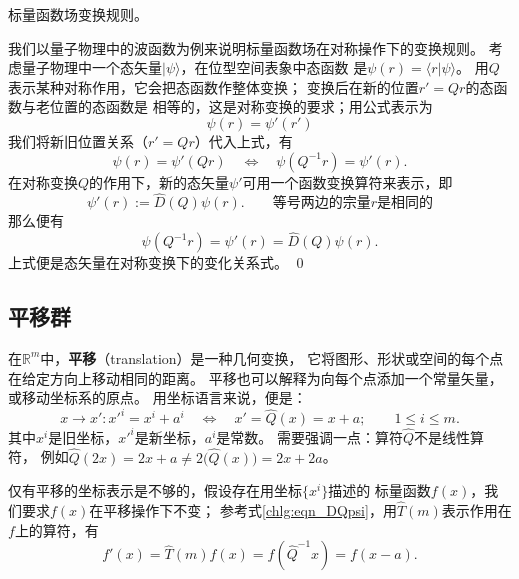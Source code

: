\begin{example}
    标量函数场变换规则。
\end{example}
我们以量子物理中的波函数为例来说明标量函数场在对称操作下的变换规则。
考虑量子物理中一个态矢量$|\psi\rangle$，在位型空间表象中态函数
是$\psi(r) = \langle r|\psi\rangle$。
用$Q$表示某种对称作用，它会把态函数作整体变换；
变换后在新的位置$r'=Q r$的态函数与老位置的态函数是
相等的，这是对称变换的要求；用公式表示为
\begin{equation}
    \psi(r) = \psi'(r')
\end{equation}
我们将新旧位置关系（$r'=Q r$）代入上式，有
\begin{equation}
    \psi(r) = \psi'(Q r) \quad \Leftrightarrow \quad
    \psi(Q^{-1}r) = \psi'(r) .
\end{equation}
在对称变换$Q$的作用下，新的态矢量$\psi'$可用一个函数变换算符来表示，即
\begin{equation}
    \psi'(r) :=\hat{D}(Q)\psi(r).
    \qquad \text{等号两边的宗量$r$是相同的}
\end{equation}
那么便有
\begin{equation}\label{chlg:eqn_DQpsi}
    \psi(Q^{-1}r)  = \psi'(r) = \hat{D}(Q)\psi(r) .
\end{equation}
上式便是态矢量在对称变换下的变化关系式。    \qed

\subsection{平移群}\label{chlg:sec_translation-group}
在$\mathbb{R}^m$中，\textbf{平移}（translation）是一种几何变换，
它将图形、形状或空间的每个点在给定方向上移动相同的距离。
平移也可以解释为向每个点添加一个常量矢量，或移动坐标系的原点。
用坐标语言来说，便是：
\begin{equation}
    x\to x' : x'^{i} = x^i + a^i
    \quad \Leftrightarrow \quad
    x' =\hat{Q}(x)= x + a ;
    \qquad 1 \leqslant i \leqslant m .
\end{equation}
其中$x^i$是旧坐标，$x'^i$是新坐标，$a^i$是常数。
需要强调一点：算符$\hat{Q}$不是线性算符，
例如$\hat{Q} (2 x) =2 x + a \neq
2\bigl(\hat{Q}(x)\bigr)=2 x + 2a$。

仅有平移的坐标表示是不够的，假设存在用坐标$\{x^i\}$描述的
标量函数$f(x)$，我们要求$f(x)$在平移操作下不变；
参考式\eqref{chlg:eqn_DQpsi}，用$\hat{T}(m)$表示作用在$f$上的算符，有
\begin{equation}\label{chlg:eqn_translationONf}
    f'(x)=\hat{T}(m) f(x)= f(\hat{Q}^{-1}x) = f(x - a) .
\end{equation}

